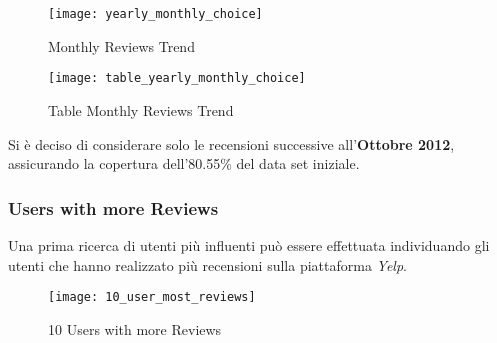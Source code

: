 \begin{figure}[!htbp]
	\texttt{[image: yearly\_monthly\_choice]}
	\caption{Monthly Reviews Trend}
	\label{yearly_monthly_choice}
\end{figure}

\begin{figure}[!htbp]
	\centering
	\texttt{[image: table\_yearly\_monthly\_choice]}
	\caption{Table Monthly Reviews Trend}
	\label{table_yearly_monthly_choice}
\end{figure}

Si è deciso di considerare solo le recensioni successive all'\textbf{Ottobre 2012},
assicurando la copertura dell'80.55\% del data set iniziale.\\

\clearpage

\subsubsection{Users with more Reviews}
Una prima ricerca di utenti più influenti può essere effettuata individuando
gli utenti che hanno realizzato più recensioni sulla piattaforma \textit{Yelp}.

\begin{figure}[!htbp]
	\texttt{[image: 10\_user\_most\_reviews]}
	\caption{10 Users with more Reviews}
	\label{10_user_most_reviews}
\end{figure}
